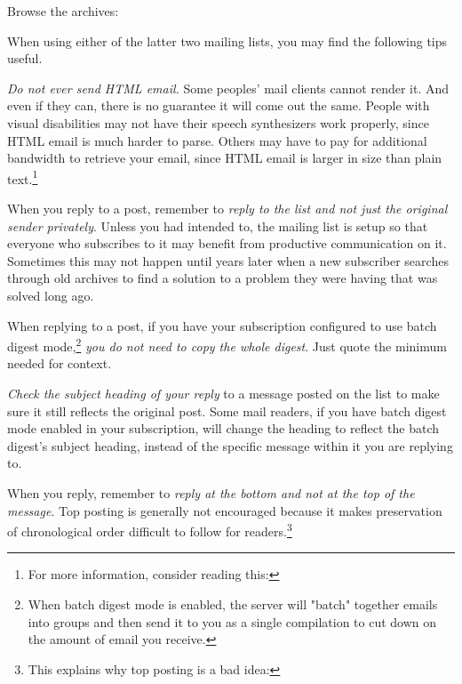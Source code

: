 Browse the archives:\crlf
{}

When using either of the latter two mailing lists, you may find the following tips useful.

\startitemize[3]
\item
{\it Do not ever send HTML email.} Some peoples' mail clients cannot render it. And even if they can, there is no guarantee it will come out the same. People with visual disabilities may not have their speech synthesizers work properly, since HTML email is much harder to parse. Others may have to pay for additional bandwidth to retrieve your email, since HTML email is larger in size than plain text.\footnote{For more information, consider reading this: }

\item
When you reply to a post, remember to {\it reply to the list and not just the original sender privately}. Unless you had intended to, the mailing list is setup so that everyone who subscribes to it may benefit from productive communication on it. Sometimes this may not happen until years later when a new subscriber searches through old archives to find a solution to a problem they were having that was solved long ago.

\item
When replying to a post, if you have your subscription configured to use batch digest mode,\footnote{When batch digest mode is enabled, the server will "batch" together emails into groups and then send it to you as a single compilation to cut down on the amount of email you receive.} {\it you do not need to copy the whole digest}. Just quote the minimum needed for context.

\item
{\it Check the subject heading of your reply} to a message posted on the list to make sure it still reflects the original post. Some mail readers, if you have batch digest mode enabled in your subscription, will change the heading to reflect the batch digest's subject heading, instead of the specific message within it you are replying to.

\item
When you reply, remember to {\it reply at the bottom and not at the top of the message}. Top posting is generally not encouraged because it makes preservation of chronological order difficult to follow for readers.\footnote{This explains why top posting is a bad idea: }
\stopitemize

